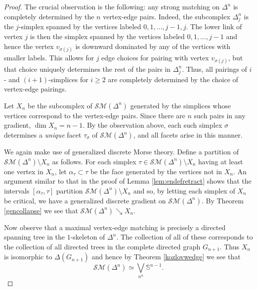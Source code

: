 \documentclass{amsart}
\theoremstyle{definition}
\newcommand{\zs}{{\mathbb S}}
\newcommand{\sm}{{\mathcal{SM}}}
\begin{document}
\begin{proof}
    The crucial observation is the following: any strong matching on $\Delta^n$ is completely determined by the $n$ vertex-edge pairs. Indeed, the subcomplex $\Delta^n_j$ is the $j$-simplex spanned by the vertices labeled $0,1,\dots,j-1,j$. The lower link of vertex $j$ is then the simplex spanned by the vertices labeled $0,1,\dots,j-1$ and hence the vertex $v_{\sigma(j)}$ is downward dominated by any of the vertices with smaller labels. This allows for $j$ edge choices for pairing with vertex $v_{\sigma(j)}$, but that choice uniquely determines the rest of the pairs in $\Delta^n_j$. Thus, all pairings of $i$- and $(i+1)$-simplices for $i\ge 2$ are completely determined by the choice of vertex-edge pairings.

    Let $X_n$ be the subcomplex of $\sm(\Delta^n)$ generated by the simplices whose vertices correspond to the vertex-edge pairs. Since there are $n$ such pairs in any gradient, $\dim X_n=n-1$. By the observation above, each such simplex $\sigma$ determines a {\em unique} facet $\tau_\sigma$ of $\sm(\Delta^n)$, and all facets arise in this manner. 

     We again make use of generalized discrete Morse theory.  Define a partition of $\sm(\Delta^n)\setminus X_n$ as follows.  For each simplex $\tau\in\sm(\Delta^n)\setminus X_n$ having at least one vertex in $X_n$, let $\alpha_\tau\subset \tau$ be the face generated by the vertices not in $X_n$. An argument similar to that in the proof of Lemma \ref{lem:endefretract} shows that the intervals $[\alpha_\tau,\tau]$ partition $\sm(\Delta^n)\setminus X_n$ and so, by letting each simplex of $X_n$ be critical, we have a generalized discrete gradient on $\sm(\Delta^n)$. By Theorem \ref{gencollapse} we see that $\sm(\Delta^n)\searrow X_n$.

    Now observe that a maximal vertex-edge matching is precisely a directed spanning tree in the $1$-skeleton of $\Delta^n$. The collection of all of these corresponds to the collection of all directed trees in the complete directed graph $G_{n+1}$. Thus $X_n$ is isomorphic to $\Delta(G_{n+1})$ and hence by Theorem \ref{kozlovwedge} we see that $$\sm(\Delta^n)\simeq \bigvee_{n^n} \zs^{n-1}.$$
\end{proof}
\end{document}
